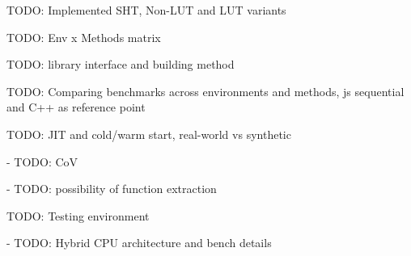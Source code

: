 



TODO: Implemented SHT, Non-LUT and LUT variants

TODO: Env x Methods matrix


TODO: library interface and building method

TODO: Comparing benchmarks across environments and methods, js sequential and C++ as reference point

TODO: JIT and cold/warm start, real-world vs synthetic

- TODO: CoV

- TODO: possibility of function extraction

TODO: Testing environment

- TODO: Hybrid CPU architecture and bench details

